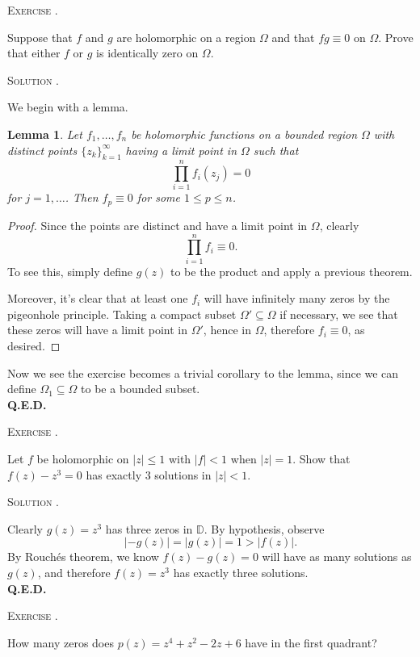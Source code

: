 \documentclass[12pt]{article}
\newcounter{problem}
\renewcommand{\qed}{\hfill\textsc{\textbf{Q.E.D.}}}
\newcommand{\D}{\ensuremath{\mathbb{D}}}
\newenvironment{problem}[1][\stepcounter{problem}\theproblem]{\bigskip\noindent\textsc{Exercise #1.}\smallskip\par\begin{itshape}}{\end{itshape}}
\newenvironment{solution}[1][\hspace{-1ex}.]{\medskip\noindent\textsc{Solution #1}\smallskip\par}{\hspace*{\fill}\\ \hspace*{0pt}\qed \clearpage}
\newtheorem{lemma}{Lemma}
\begin{document}
\begin{problem}
    Suppose that $f$ and $g$ are holomorphic on a region $\Omega$ and that $fg\equiv0$ on $\Omega$. Prove that either $f$ or $g$ is identically zero on $\Omega$.
\end{problem}

\begin{solution}
    We begin with a lemma.
    \begin{lemma}
        Let $f_1,\ldots,f_n$ be holomorphic functions on a  bounded region $\Omega$ with distinct points $\{z_k\}_{k=1}^\infty$ having a limit point in $\Omega$ such that
        \[
            \prod_{i=1}^n f_i(z_j)=0
        \]
        for $j=1,\ldots$. Then $f_p\equiv0$ for some $1\leq p\leq n$.
    \end{lemma}
    
    \begin{proof}
        Since the points are distinct and have a limit point in $\Omega$, clearly
        \[
            \prod_{i=1}^n f_i\equiv0.
        \]
        To see this, simply define $g(z)$ to be the product and apply a previous theorem.
        
        Moreover, it's clear that at least one $f_i$ will have infinitely many zeros by the pigeonhole principle. Taking a compact subset $\Omega'\subseteq\Omega $ if necessary, we see that these zeros will have a limit point in $\Omega'$, hence in $\Omega$, therefore $f_i\equiv 0$, as desired.
    \end{proof}
    
    Now we see the exercise becomes a trivial corollary to the lemma, since we can define $\Omega_1\subseteq \Omega$ to be a bounded subset.
\end{solution}

\begin{problem}
    Let $f$ be holomorphic on $|z|\leq1$ with $|f|<1$ when $|z|=1$. Show that $f(z)-z^3=0$ has exactly $3$ solutions in $|z|<1$.
\end{problem}

\begin{solution}
    Clearly $g(z)=z^3$ has three zeros in $\D$. By hypothesis, observe
    \[
        |-g(z)|=|g(z)|=1>|f(z)|.
    \]
    By Rouch\'{e}s theorem, we know $f(z)-g(z)=0$ will have as many solutions as $g(z)$, and therefore $f(z)=z^3$ has exactly three solutions. 
\end{solution}

\begin{problem}
    How many zeros does $p(z)=z^4+z^2-2z+6$ have in the first quadrant?
\end{problem}
\end{document}
